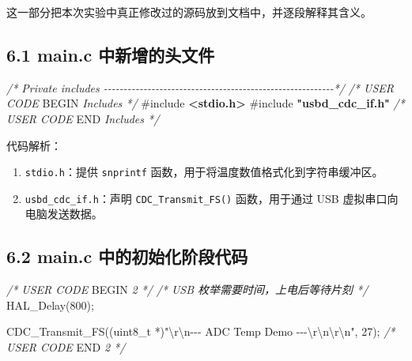 \documentclass[
  chinese,
  UTF8,
  oneside,
  openany]{ctexbook}
\newenvironment{Shaded}{}{}
\newcommand{\CommentTok}[1]{\textcolor[rgb]{0.38,0.63,0.69}{\textit{#1}}}
\newcommand{\DataTypeTok}[1]{\textcolor[rgb]{0.56,0.13,0.00}{#1}}
\newcommand{\DecValTok}[1]{\textcolor[rgb]{0.25,0.63,0.44}{#1}}
\newcommand{\ImportTok}[1]{\textcolor[rgb]{0.00,0.50,0.00}{\textbf{#1}}}
\newcommand{\NormalTok}[1]{#1}
\newcommand{\OperatorTok}[1]{\textcolor[rgb]{0.40,0.40,0.40}{#1}}
\newcommand{\PreprocessorTok}[1]{\textcolor[rgb]{0.74,0.48,0.00}{#1}}
\newcommand{\RegionMarkerTok}[1]{#1}
\newcommand{\SpecialCharTok}[1]{\textcolor[rgb]{0.25,0.44,0.63}{#1}}
\newcommand{\StringTok}[1]{\textcolor[rgb]{0.25,0.44,0.63}{#1}}
\providecommand{\tightlist}{%
  \setlength{\itemsep}{0pt}\setlength{\parskip}{0pt}}
\begin{document}
这一部分把本次实验中真正修改过的源码放到文档中，并逐段解释其含义。

\subsection{6.1 main.c
中新增的头文件}\label{main.c-ux4e2dux65b0ux589eux7684ux5934ux6587ux4ef6}

\begin{Shaded}
\begin{Highlighting}[]
\CommentTok{/* Private includes {-}{-}{-}{-}{-}{-}{-}{-}{-}{-}{-}{-}{-}{-}{-}{-}{-}{-}{-}{-}{-}{-}{-}{-}{-}{-}{-}{-}{-}{-}{-}{-}{-}{-}{-}{-}{-}{-}{-}{-}{-}{-}{-}{-}{-}{-}{-}{-}{-}{-}{-}{-}{-}{-}{-}{-}{-}{-}*/}
\CommentTok{/* USER CODE }\RegionMarkerTok{BEGIN}\CommentTok{ Includes */}
\PreprocessorTok{\#include }\ImportTok{\textless{}stdio.h\textgreater{}}
\PreprocessorTok{\#include }\ImportTok{"usbd\_cdc\_if.h"}
\CommentTok{/* USER CODE }\RegionMarkerTok{END}\CommentTok{ Includes */}
\end{Highlighting}
\end{Shaded}

代码解析：

\begin{enumerate}
\def\labelenumi{\arabic{enumi}.}
\tightlist
\item
  \texttt{stdio.h}：提供 \texttt{snprintf}
  函数，用于将温度数值格式化到字符串缓冲区。
\item
  \texttt{usbd\_cdc\_if.h}：声明 \texttt{CDC\_Transmit\_FS()}
  函数，用于通过 USB 虚拟串口向电脑发送数据。
\end{enumerate}

\subsection{6.2 main.c
中的初始化阶段代码}\label{main.c-ux4e2dux7684ux521dux59cbux5316ux9636ux6bb5ux4ee3ux7801-1}

\begin{Shaded}
\begin{Highlighting}[]
\CommentTok{/* USER CODE }\RegionMarkerTok{BEGIN}\CommentTok{ 2 */}
\CommentTok{/* USB 枚举需要时间，上电后等待片刻 */}
\NormalTok{HAL\_Delay}\OperatorTok{(}\DecValTok{800}\OperatorTok{);}

\NormalTok{CDC\_Transmit\_FS}\OperatorTok{((}\DataTypeTok{uint8\_t} \OperatorTok{*)}\StringTok{"}\SpecialCharTok{\textbackslash{}r\textbackslash{}n}\StringTok{{-}{-}{-} ADC Temp Demo {-}{-}{-}}\SpecialCharTok{\textbackslash{}r\textbackslash{}n\textbackslash{}r\textbackslash{}n}\StringTok{"}\OperatorTok{,} \DecValTok{27}\OperatorTok{);}
\CommentTok{/* USER CODE }\RegionMarkerTok{END}\CommentTok{ 2 */}
\end{Highlighting}
\end{Shaded}
\end{document}
